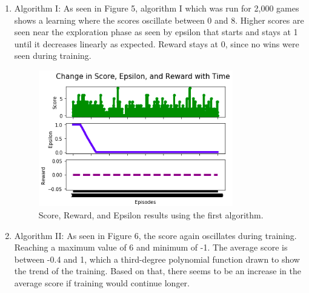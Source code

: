 \documentclass{article}
\begin{document}
\begin{enumerate}
    \item Algorithm I: As seen in Figure 5, algorithm I which was run for 2,000 games shows a learning where the scores oscillate between 0 and 8. Higher scores are seen near the exploration phase as seen by epsilon that starts and stays at 1 until it decreases linearly as expected. Reward stays at 0, since no wins were seen during training. 
    
    \begin{figure}[H]
    \centering
    \includegraphics[width=0.8\textwidth]{Results_01.png}\hfill
    \caption{Score, Reward, and Epsilon results using the first algorithm.} 
\end{figure}
    
    \item Algorithm II: As seen in Figure 6, the score again oscillates during training. Reaching a maximum value of 6 and minimum of -1. The average score is between -0.4 and 1, which a third-degree polynomial function drawn to show the trend of the training. Based on that, there seems to be an increase in the average score if training would continue longer.
    

\end{enumerate}
\end{document}
